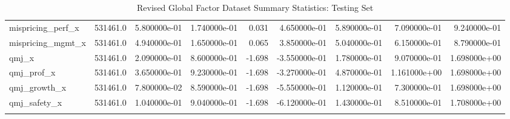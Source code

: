 \documentclass[12pt]{article}
\begin{document}
\begin{landscape}
\begin{longtable}{|l|r|r|r|r|r|r|r|r|}
		mispricing\_perf\_x      & 531461.0 & 5.800000e-01  & 1.740000e-01 & 0.031      & 4.650000e-01  & 5.890000e-01  & 7.090000e-01  & 9.240000e-01 \\
		mispricing\_mgmt\_x      & 531461.0 & 4.940000e-01  & 1.650000e-01 & 0.065      & 3.850000e-01  & 5.040000e-01  & 6.150000e-01  & 8.790000e-01 \\
		qmj\_x                   & 531461.0 & 2.090000e-01  & 8.600000e-01 & -1.698     & -3.550000e-01 & 1.780000e-01  & 9.070000e-01  & 1.698000e+00 \\
		qmj\_prof\_x             & 531461.0 & 3.650000e-01  & 9.230000e-01 & -1.698     & -3.270000e-01 & 4.870000e-01  & 1.161000e+00  & 1.698000e+00 \\
		qmj\_growth\_x           & 531461.0 & 7.800000e-02  & 8.590000e-01 & -1.698     & -5.550000e-01 & 1.120000e-01  & 7.300000e-01  & 1.698000e+00 \\
		qmj\_safety\_x           & 531461.0 & 1.040000e-01  & 9.040000e-01 & -1.698     & -6.120000e-01 & 1.430000e-01  & 8.510000e-01  & 1.708000e+00 \\
		\bottomrule
		\caption{Revised Global Factor Dataset Summary Statistics: Testing Set}
		\label{table:ss-test}
	\end{longtable}
\end{landscape}
\end{document}
